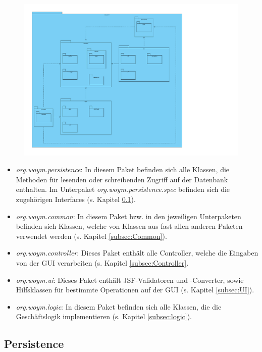 \documentclass[fontsize=12pt,paper=a4,twoside]{scrartcl}
\begin{document}
\begin{figure}[H]
\centering
\includegraphics[width=\textwidth]{packages.pdf}
\end{figure}

\begin{itemize}
\item \textit{org.woym.persistence}: In diesem Paket befinden sich alle Klassen, die Methoden für lesenden oder schreibenden Zugriff auf der Datenbank enthalten. Im Unterpaket \textit{org.woym.persistence.spec} befinden sich die zugehörigen Interfaces (s. Kapitel \ref{subsec:persistence}).
\item \textit{org.woym.common}: In diesem Paket  bzw. in den jeweiligen Unterpaketen befinden sich Klassen, welche von Klassen aus fast allen anderen Paketen verwendet werden (s. Kapitel \ref{subsec:Common}). 
\item \textit{org.woym.controller}: Dieses Paket enthält alle Controller, welche die Eingaben von der GUI verarbeiten (s. Kapitel \ref{subsec:Controller}.
\item \textit{org.woym.ui}: Dieses Paket enthält JSF-Validatoren und -Converter, sowie Hilfsklassen für bestimmte Operationen auf der GUI (s. Kapitel \ref{subsec:UI}).
\item \textit{org.woym.logic}: In diesem Paket befinden sich alle Klassen, die die Geschäftslogik implementieren (s. Kapitel \ref{subsec:logic}).
\end{itemize}


\subsection{Persistence}
\label{subsec:persistence}
\end{document}
